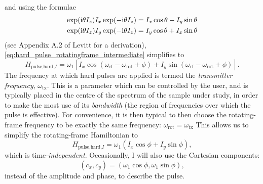 and using the formulae
\begin{align}
    \exp(\mathrm{i}\theta I_z)I_x\exp(-\mathrm{i}\theta I_z) = I_x\cos\theta - I_y\sin\theta \label{eq:sandwich_formula_1} \\
    \exp(\mathrm{i}\theta I_z)I_y\exp(-\mathrm{i}\theta I_z) = I_y\cos\theta + I_x\sin\theta \label{eq:sandwich_formula_2}
\end{align}
(see Appendix A.2 of Levitt\autocite{Levitt2008} for a derivation), \cref{eq:hard_pulse_rotatingframe_intermediate} simplifies to
\begin{equation}
    \label{eq:hard_pulse_rotatingframe}
    H_{\text{pulse,hard,}I} = \omega_1 \left[I_x \cos(\omega_\text{rf} - \omega_\text{rot} + \phi) + I_y \sin(\omega_\text{rf} - \omega_\text{rot} + \phi) \right].
\end{equation}
The frequency at which hard pulses are applied is termed the \textit{transmitter frequency}, $\omega_\text{tx}$.
This is a parameter which can be controlled by the user, and is typically placed in the centre of the spectrum of the sample under study, in order to make the most use of its \textit{bandwidth} (the region of frequencies over which the pulse is effective).
For convenience, it is then typical to then choose the rotating-frame frequency to be exactly the same frequency: $\omega_\text{rot} = \omega_\text{tx}$
This allows us to simplify the rotating-frame Hamiltonian to
\begin{equation}
    \label{eq:hard_pulse_onresonance}
    H_{\text{pulse,hard,}I} = \omega_1 (I_x\cos\phi + I_y\sin\phi),
\end{equation}
which is time-\textit{independent}.
Occasionally, I will also use the Cartesian components:
\begin{equation}
    \label{eq:pulse_cartesian}
    (c_x, c_y) = (\omega_1 \cos\phi, \omega_1 \sin\phi),
\end{equation}
instead of the amplitude and phase, to describe the pulse.

